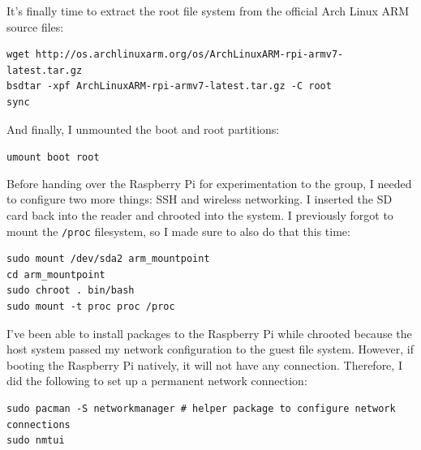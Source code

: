 It's finally time to extract the root file system from the official Arch Linux ARM source files:

\begin{verbatim}
wget http://os.archlinuxarm.org/os/ArchLinuxARM-rpi-armv7-latest.tar.gz
bsdtar -xpf ArchLinuxARM-rpi-armv7-latest.tar.gz -C root
sync
\end{verbatim}

And finally, I unmounted the boot and root partitions:

\Verb"umount boot root"


Before handing over the Raspberry Pi for experimentation to the group, I needed to configure two more things: SSH and wireless networking. I inserted the SD card back into the reader and chrooted into the system. I previously forgot to mount the \Verb"/proc" filesystem, so I made sure to also do that this time:

\begin{verbatim}
sudo mount /dev/sda2 arm_mountpoint
cd arm_mountpoint
sudo chroot . bin/bash
sudo mount -t proc proc /proc
\end{verbatim}
    
I've been able to install packages to the Raspberry Pi while chrooted because the host system passed my network configuration to the guest file system. However, if booting the Raspberry Pi natively, it will not have any connection. Therefore, I did the following to set up a permanent network connection:

\begin{verbatim}
sudo pacman -S networkmanager # helper package to configure network connections
sudo nmtui
\end{verbatim}

